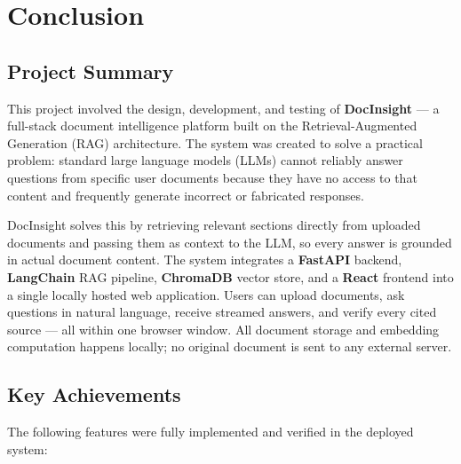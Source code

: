 
\chapter{Conclusion}

\section{Project Summary}

This project involved the design, development, and testing of \textbf{DocInsight}
--- a full-stack document intelligence platform built on the
Retrieval-Augmented Generation (RAG) architecture. The system was created to
solve a practical problem: standard large language models (LLMs) cannot reliably
answer questions from specific user documents because they have no access to that
content and frequently generate incorrect or fabricated responses.

DocInsight solves this by retrieving relevant sections directly from uploaded
documents and passing them as context to the LLM, so every answer is grounded in
actual document content. The system integrates a \textbf{FastAPI} backend,
\textbf{LangChain} RAG pipeline, \textbf{ChromaDB} vector store, and a
\textbf{React} frontend into a single locally hosted web application. Users can
upload documents, ask questions in natural language, receive streamed answers, and
verify every cited source --- all within one browser window. All document storage
and embedding computation happens locally; no original document is sent to any
external server.

\section{Key Achievements}

The following features were fully implemented and verified in the deployed system:

